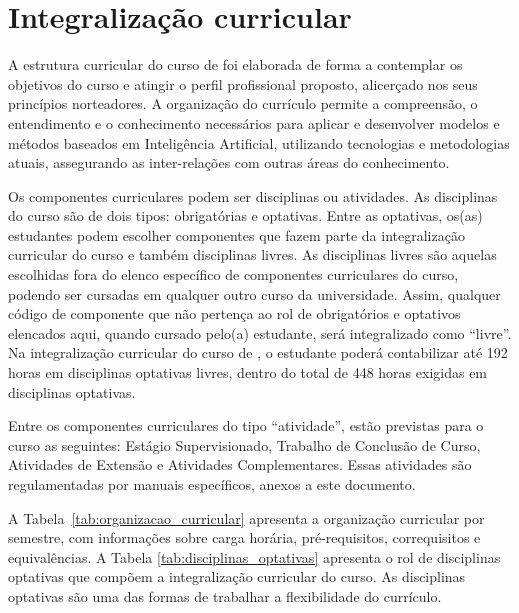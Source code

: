 \section{Integralização curricular} \label{sec:integralizacao}

A estrutura curricular do curso de \nomedocurso foi elaborada de forma a contemplar os objetivos do curso e atingir o perfil profissional proposto, alicerçado nos seus princípios norteadores. A organização do currículo permite a compreensão, o entendimento e o conhecimento necessários para aplicar e desenvolver modelos e métodos baseados em Inteligência Artificial, utilizando tecnologias e metodologias atuais, assegurando as inter-relações com outras áreas do conhecimento. 

Os componentes curriculares podem ser disciplinas ou atividades. As disciplinas do curso são de dois tipos: obrigatórias e optativas. Entre as optativas, os(as) estudantes podem escolher componentes que fazem parte da integralização curricular do curso e também disciplinas livres. As disciplinas livres são aquelas escolhidas fora do elenco específico de componentes curriculares do curso, podendo ser cursadas em qualquer outro curso da universidade. Assim, qualquer código de componente que não pertença ao rol de obrigatórios e optativos elencados aqui, quando cursado pelo(a) estudante, será integralizado como ``livre''. %
%
Na integralização curricular do curso de \nomedocurso, o estudante poderá contabilizar até 192 horas em disciplinas optativas livres, dentro do total de 448 horas exigidas em disciplinas optativas. 

Entre os componentes curriculares do tipo ``atividade'', estão previstas para o curso as seguintes: Estágio Supervisionado, Trabalho de Conclusão de Curso, Atividades de Extensão e Atividades Complementares. Essas atividades são regulamentadas por manuais específicos, anexos a este documento. 

A Tabela~\ref{tab:organizacao_curricular} apresenta a organização curricular por semestre, com informações sobre carga horária, pré-requisitos, correquisitos e equivalências. A Tabela \ref{tab:disciplinas_optativas} apresenta o rol de disciplinas optativas que compõem a integralização curricular do curso. As disciplinas optativas são uma das formas de trabalhar a flexibilidade do currículo.%


